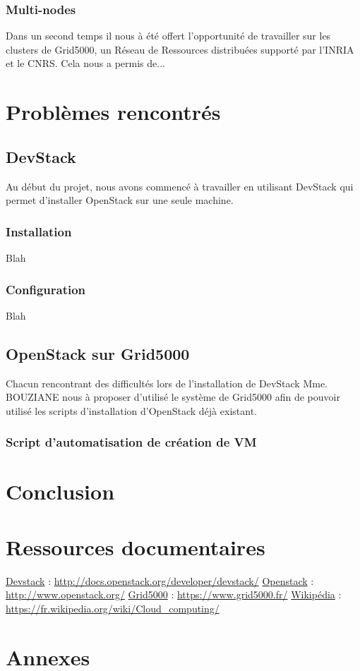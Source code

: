 \documentclass{report}
\begin{document}
        \subsection{Multi-nodes}
            Dans un second temps il nous à été offert l'opportunité de travailler sur les clusters
            de Grid5000, un Réseau de Ressources distribuées supporté par l'INRIA et le CNRS.\break
            Cela nous a permis de...


\chapter{Problèmes rencontrés}
    \section{DevStack}
        Au début du projet, nous avons commencé à travailler en utilisant DevStack qui permet d'installer OpenStack sur une seule machine.
        \subsection{Installation}
            Blah
        \subsection{Configuration}
            Blah
    \section{OpenStack sur Grid5000}
        Chacun rencontrant des difficultés lors de l'installation de DevStack Mme. BOUZIANE nous à proposer d'utilisé le système de Grid5000 afin de pouvoir utilisé les scripts d'installation d'OpenStack déjà existant.
        \subsection{Script d'automatisation de création de VM}
            



\newpage
\chapter*{Conclusion}


\newpage
\chapter*{Ressources documentaires}
\href{http://docs.openstack.org/developer/devstack/}{Devstack} :
\url{http://docs.openstack.org/developer/devstack/}
\bigbreak
\href{http://www.openstack.org/}{Openstack} :
\url{http://www.openstack.org/}
\bigbreak
\href{https://www.grid5000.fr/}{Grid5000} :
\url{https://www.grid5000.fr/}
\bigbreak
\href{https://fr.wikipedia.org/wiki/Cloud_computing/}{Wikipédia} :
\url{https://fr.wikipedia.org/wiki/Cloud_computing/}



\newpage
\chapter*{Annexes}
\end{document}
